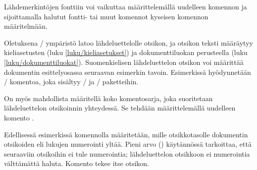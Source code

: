 \begin{koodilohkosis}
\setlength{\parindent}{1.1em} %
\setlength{\bibhang}{\parindent}
\setlength{\bibsep}{.5ex plus .1ex minus .1ex}
\end{koodilohkosis}

\noindent
Lähdemerkintöjen fonttiin voi vaikuttaa määrittelemällä uudelleen
komennon  ja sijoittamalla halutut fontti- tai muut
komennot kyseisen komennon määritelmään.

\begin{koodilohkosis}
\renewcommand{\bibfont}{\sffamily\small}
\end{koodilohkosis}

\noindent
Oletuksena \-/ ympäristö latoo
lähdeluettelolle otsikon, ja otsikon teksti määräytyy kieliasetusten
(luku \ref{luku/kieliasetukset}) ja dokumenttiluokan perusteella (luku
\ref{luku/dokumenttiluokat}). Suomenkielisen lähdeluettelon otsikon voi
määrittää dokumentin esittelyosassa seuraavan esimerkin tavoin.
Esimerkissä hyödynnetään \-/ komentoa, joka sisältyy
\-/{} ja \-/ paketteihin.

\begin{koodilohkosis}
\addto{\captionsfinnish}{%
  \renewcommand{\refname}{Lähteet} %
  \renewcommand{\bibname}{Lähteet} %
}
\end{koodilohkosis}

\noindent
On myös mahdollista määritellä koko komentosarja, joka suoritetaan
lähdeluettelon otsikoinnin yhteydessä. Se tehdään määrittelemällä
uudelleen komento .

\begin{koodilohkosis}
\renewcommand{\bibsection}{%
  \setcounter{secnumdepth}{-1}
  \section{Lähteet}
}
\end{koodilohkosis}

\noindent
Edellisessä esimerkissä komennolla  määritetään,
mille otsikkotasolle dokumentin otsikoiden eli lukujen numerointi yltää.
Pieni arvo \mbox{()} käytännössä tarkoittaa, että seuraaviin
otsikoihin ei tule numerointia; lähdeluettelon otsikkoon ei numerointia
välttämättä haluta. Komento  tekee itse otsikon.

